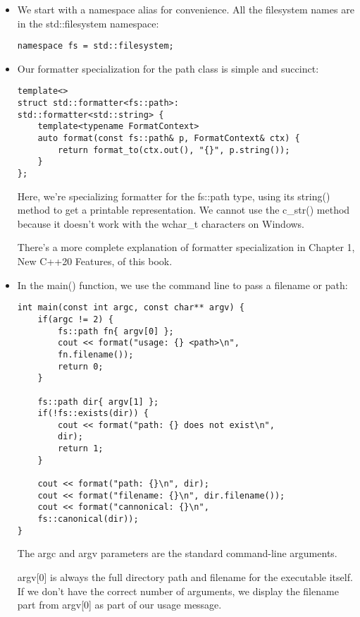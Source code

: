 \begin{itemize}
\item 
We start with a namespace alias for convenience. All the filesystem names are in the std::filesystem namespace:

\begin{lstlisting}[style=styleCXX]
namespace fs = std::filesystem;
\end{lstlisting}

\item 
Our formatter specialization for the path class is simple and succinct:

\begin{lstlisting}[style=styleCXX]
template<>
struct std::formatter<fs::path>:
std::formatter<std::string> {
	template<typename FormatContext>
	auto format(const fs::path& p, FormatContext& ctx) {
		return format_to(ctx.out(), "{}", p.string());
	}
};
\end{lstlisting}

Here, we're specializing formatter for the fs::path type, using its string() method to get a printable representation. We cannot use the c\_str() method because it doesn't work with the wchar\_t characters on Windows.

There's a more complete explanation of formatter specialization in Chapter 1, New C++20 Features, of this book.

\item 
In the main() function, we use the command line to pass a filename or path:

\begin{lstlisting}[style=styleCXX]
int main(const int argc, const char** argv) {
	if(argc != 2) {
		fs::path fn{ argv[0] };
		cout << format("usage: {} <path>\n",
		fn.filename());
		return 0;
	}

	fs::path dir{ argv[1] };
	if(!fs::exists(dir)) {
		cout << format("path: {} does not exist\n",
		dir);
		return 1;
	}

	cout << format("path: {}\n", dir);
	cout << format("filename: {}\n", dir.filename());
	cout << format("cannonical: {}\n",
	fs::canonical(dir));
}
\end{lstlisting}

The argc and argv parameters are the standard command-line arguments.

argv[0] is always the full directory path and filename for the executable itself. If we don't have the correct number of arguments, we display the filename part from argv[0] as part of our usage message.


\end{itemize}
